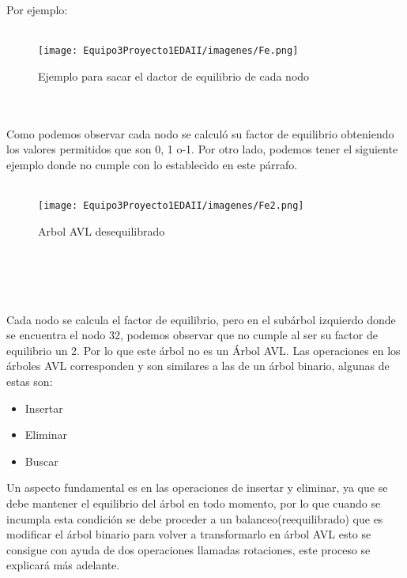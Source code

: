 \documentclass{report}
\begin{document}
Por ejemplo:\\\\
\begin{figure}[h]
        \centering
        \texttt{[image: Equipo3Proyecto1EDAII/imagenes/Fe.png]}
        \caption{Ejemplo para sacar el dactor de equilibrio de cada nodo}
        \label{fig:my_label}
    \end{figure}{}\\\\
Como podemos observar cada nodo se calculó su factor de equilibrio obteniendo los valores permitidos que son 0, 1 o-1. Por otro lado, podemos tener el siguiente ejemplo donde no cumple con lo establecido en este párrafo.\\\\
\begin{figure}[h]
        \centering
        \texttt{[image: Equipo3Proyecto1EDAII/imagenes/Fe2.png]}
        \caption{Arbol AVL desequilibrado}
        \label{fig:my_label}
    \end{figure}{}\\\\
\\\\Cada nodo se calcula el factor de equilibrio, pero en el subárbol izquierdo donde se encuentra el nodo 32, podemos observar que no cumple al ser su factor de equilibrio un 2. Por lo que este árbol no es un Árbol AVL. 
Las operaciones en los árboles AVL corresponden y son similares a las de un árbol binario, algunas de estas son:
\begin{itemize}
    \item Insertar
    \item Eliminar
    \item Buscar
\end{itemize}
Un aspecto fundamental es en las operaciones de insertar y eliminar, ya que se debe mantener el equilibrio del árbol en todo momento, por lo que cuando se incumpla esta condición se debe proceder a un balanceo(reequilibrado) que es modificar el árbol binario para volver a transformarlo en árbol AVL esto se consigue con ayuda de dos operaciones llamadas rotaciones, este proceso se explicará más adelante.\\\\
\end{document}
